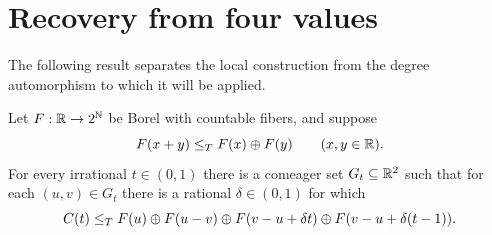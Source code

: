 \section{Recovery from four values}\label{sec:recovery}

The following result separates the local construction from the
degree automorphism to which it will be applied.

\begin{proposition}\label{prop:recovery}
Let $F:\mathbb R\to2^\mathbb N$ be Borel with countable fibers, and suppose
\[
F(x+y)\le_T F(x)\oplus F(y)\qquad(x,y\in\mathbb R).
\]
For every irrational $t\in(0,1)$ there is a comeager set
$G_t\subseteq\mathbb R^2$ such that for each $(u,v)\in G_t$ there
is a rational $\delta\in(0,1)$ for which
\begin{equation}\label{eq:four-values}
C(t)\le_T
F(u)\oplus F(u-v)\oplus
F(v-u+\delta t)\oplus F(v-u+\delta(t-1)).
\end{equation}
\end{proposition}

